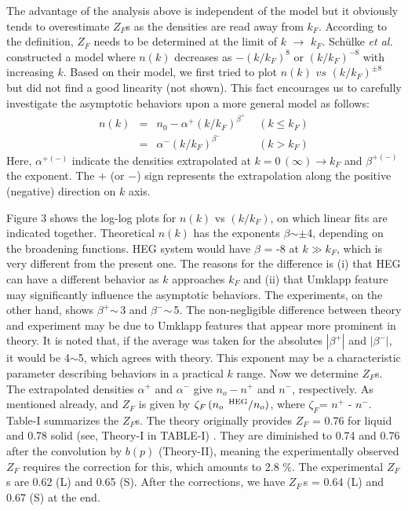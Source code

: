 \documentclass[twocolumn,showpacs,showkeys,fleqn,prl,superscriptaddress]{revtex4}%
\newcommand{\nn}[1]{\textnormal{ #1}}
\newcommand{\ii}[1]{\textit{#1}}
\begin{document}
The advantage of the analysis above is independent of the model but it obviously tends to overestimate $Z_F$s as the densities are read away from $k_F$.
According to the definition, $Z_F$ needs to be determined at the limit of $k$ $\to$ $k_F$. 
Sch{\"u}lke \ii{et al.}\,\,constructed a model where $n(k)$ decreases as $-(k/k_F)^{8}$ or $(k/k_F)^{-8}$ with increasing $k$\cite{schulke96}.
Based on their model, we first tried to plot $n(k)$ $vs$ $(k/k_F)^{\pm 8}$ but did not find a good linearity (not shown).
This fact encourages us to carefully investigate the asymptotic behaviors upon a more general model as follows: 
\begin{eqnarray}
n(k) &=& n_0 - \alpha^{+}  (k/k_F)^{\beta^+}  \;\;\;\; (k \leq k_F)  \nonumber \\
&=&  \alpha^{-}  (k/k_F)^{\beta^-}  \;\;\;\;\;\;\;\;\;\;\;\; (k>k_F)
\end{eqnarray}
Here, $\alpha^{+(-)}$ indicate the densities extrapolated at ${k=0\,(\infty) \to k_F}$ and $\beta^{+(-)}$ the exponent.
The $+$ (or $-$) sign represents the extrapolation along the positive (negative) direction on $k$ axis.

Figure 3 shows the log-log plots for $n(k)$ vs $(k/k_F)$, on which linear fits are indicated together. 
Theoretical $n(k)$ has the exponents $\beta$$\sim\pm$4, depending on the broadening functions.
HEG system would have $\beta$ = -8 at $k \gg k_F$, which is very different from the present one.
The reasons for the difference is (i) that HEG can have a different behavior as $k$ approaches $k_F$ and (ii) that Umklapp feature may significantly influence the asymptotic behaviors.
The experiments, on the other hand, shows $\beta^+$$\sim\,$3 and $\beta^-$$\sim\,$5. 
The non-negligible difference between theory and experiment may be due to Umklapp features that appear more prominent in theory.
It is noted that, if the average was taken for the absolutes $| \beta^+ |$ and $| \beta^- |$, it would be 4$\sim$5, which agrees with theory.
This exponent may be a characteristic parameter describing behaviors in a practical $k$ range.
Now we determine $Z_F$s. 
The extrapolated densities $\alpha^+$ and $\alpha^-$ give $n_o - n^+$ and $n^-$, respectively.
As mentioned already,  and $Z_F$ is given by $\zeta_F\,(n_o\,^{\nn{HEG}}/n_o) $, where $\zeta_F$= $n^+$ - $n^-$.   
Table-I summarizes the $Z_F$s. 
The theory originally provides $Z_F$ = 0.76 for liquid and 0.78 solid  (see, Theory-I in TABLE-I) .
They are diminished to 0.74 and 0.76 after the convolution by $b(p)$ (Theory-II), meaning the experimentally observed $Z_F$ requires the correction for this, which amounts to 2.8 \%.
The experimental $Z_F\,$s are 0.62 (L) and 0.65 (S). After the corrections, we have $Z_F\,$s = 0.64 (L) and 0.67 (S) at the end.    
\end{document}
